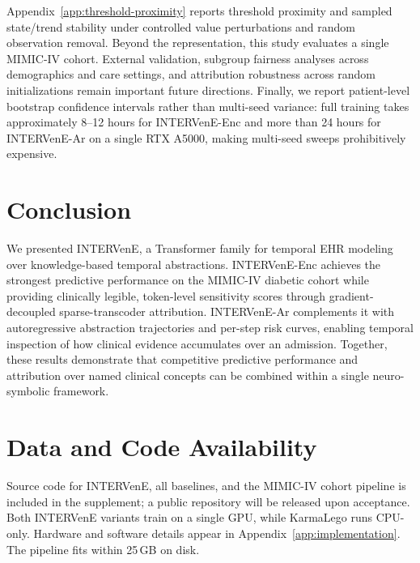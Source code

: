 \documentclass[letterpaper]{article} %
\begin{document}
Appendix~\ref{app:threshold-proximity} reports threshold proximity and sampled state/trend stability under controlled value perturbations and random observation removal. Beyond the representation, this study evaluates a single MIMIC-IV cohort. External validation, subgroup fairness analyses across demographics and care settings, and attribution robustness across random initializations remain important future directions. Finally, we report patient-level bootstrap confidence intervals rather than multi-seed variance: full training takes approximately 8--12 hours for INTERVenE-Enc and more than 24 hours for INTERVenE-Ar on a single RTX A5000, making multi-seed sweeps prohibitively expensive.

\section{Conclusion}

We presented INTERVenE, a Transformer family for temporal EHR modeling over knowledge-based temporal abstractions. INTERVenE-Enc achieves the strongest predictive performance on the MIMIC-IV diabetic cohort while providing clinically legible, token-level sensitivity scores through gradient-decoupled sparse-transcoder attribution. INTERVenE-Ar complements it with autoregressive abstraction trajectories and per-step risk curves, enabling temporal inspection of how clinical evidence accumulates over an admission. Together, these results demonstrate that competitive predictive performance and attribution over named clinical concepts can be combined within a single neuro-symbolic framework.

\section*{Data and Code Availability}
Source code for INTERVenE, all baselines, and the MIMIC-IV cohort pipeline is included in the supplement; a public repository will be released upon acceptance. Both INTERVenE variants train on a single GPU, while KarmaLego runs CPU-only. Hardware and software details appear in Appendix~\ref{app:implementation}. The pipeline fits within 25\,GB on disk.

\clearpage


%
\end{document}
